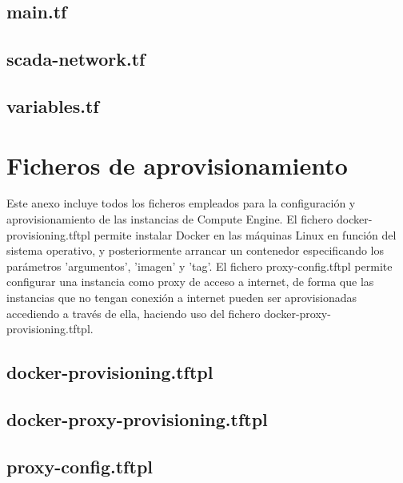 \section*{main.tf} 


\section*{scada-network.tf}


\section*{variables.tf}


\chapter{Ficheros de aprovisionamiento} \label{sec:anxE}
  Este anexo incluye todos los ficheros empleados para la configuración y aprovisionamiento de las instancias de Compute Engine. El fichero docker-provisioning.tftpl permite instalar Docker en las máquinas Linux en función del sistema operativo, y posteriormente arrancar un contenedor especificando los parámetros 'argumentos', 'imagen' y 'tag'. El fichero proxy-config.tftpl permite configurar una instancia como proxy de acceso a internet, de forma que las instancias que no tengan conexión a internet pueden ser aprovisionadas accediendo a través de ella, haciendo uso del fichero docker-proxy-provisioning.tftpl.

\section*{docker-provisioning.tftpl} 

\clearpage

\section*{docker-proxy-provisioning.tftpl} 


\section*{proxy-config.tftpl} 


